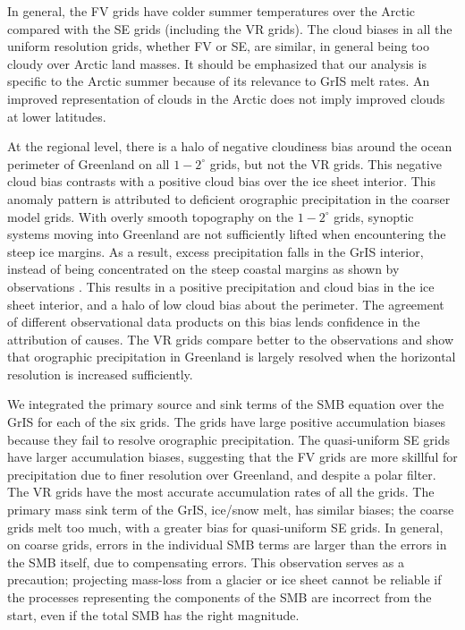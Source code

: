 \documentclass[draft]{agujournal2019}
\begin{document}
In general, the FV grids have colder summer temperatures over the Arctic compared with the SE grids (including the VR grids). The cloud biases in all the {\color{blue}{lat-lon and quasi-}}uniform resolution grids, whether FV or SE, are similar, in general being too cloudy over Arctic land masses. It should be emphasized that our analysis is specific to the Arctic summer because of its relevance to GrIS melt rates. An improved representation of clouds in the Arctic does not imply improved clouds at lower latitudes.

At the regional level, there is a halo of negative cloudiness bias around the ocean perimeter of Greenland on all $1-2^{\circ}$ grids, but not the VR grids. This negative cloud bias contrasts with a positive cloud bias over the ice sheet interior. This anomaly pattern is attributed to deficient orographic precipitation in the coarser model grids.  With overly smooth topography on the $1-2^{\circ}$ grids, synoptic systems moving into Greenland are not sufficiently lifted when encountering the steep ice margins. As a result, excess precipitation falls in the GrIS interior, instead of being concentrated on the steep coastal margins as shown by observations \cite{P2000GPC,VETAL2018TC}. This results in a positive precipitation and cloud bias in the ice sheet interior, and a halo of low cloud bias about the perimeter. The agreement of different observational data products on this bias lends confidence in the attribution of causes. The VR grids compare better to the observations and show that orographic precipitation in Greenland is largely resolved when the horizontal resolution is increased sufficiently.

We integrated the primary source and sink terms of the SMB equation over the GrIS for each of the six grids. The {} grids have large positive accumulation biases because they fail to resolve orographic precipitation. The quasi-uniform SE grids have larger accumulation biases, suggesting that the FV grids are more skillful for precipitation due to finer resolution over Greenland, and despite a polar filter. The VR grids have the most accurate accumulation rates of all the grids. The primary mass sink term of the GrIS, ice/snow melt, has similar biases; the coarse grids melt too much, with a greater bias for quasi-uniform SE grids. In general, on coarse grids, errors in the individual SMB terms are larger than the errors in the SMB itself, due to compensating errors. This observation serves as a precaution; projecting mass-loss from a glacier or ice sheet cannot be reliable if the processes representing the components of the SMB are incorrect from the start, even if the total SMB has the right magnitude.
\end{document}
